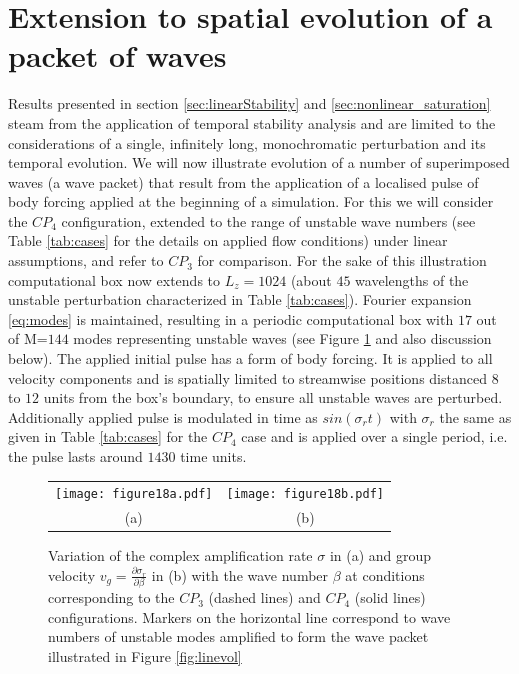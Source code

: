 \documentclass[lineno]{jfm}
\begin{document}
{
\section{Extension to spatial evolution of a packet of waves}
\label{sec:spat-temp}
Results presented in section \ref{sec:linearStability}
and \ref{sec:nonlinear_saturation} steam from the application of temporal stability analysis and are limited to the considerations of a single, infinitely long, monochromatic perturbation and its temporal evolution.
We will now illustrate evolution of a number of superimposed waves (a wave packet) that result from the application of a localised pulse of body forcing applied at the beginning of a simulation.
For this we will consider the $CP_4$ configuration, extended to the range of unstable wave numbers (see Table \ref{tab:cases} for the details on applied flow conditions) under linear assumptions, and refer to $CP_3$ for comparison.
For the sake of this illustration computational box now extends to $L_z=1024$ (about $45$ wavelengths of the unstable perturbation characterized in Table \ref{tab:cases}). Fourier expansion \eqref{eq:modes} is maintained, resulting in a periodic computational box with $17$ out of M=$144$ modes representing unstable waves (see Figure \ref{fig:cp3cp4} and also discussion below).
The applied initial pulse has a form of body forcing. It is applied to all velocity components and is spatially limited to streamwise positions distanced $8$ to $12$ units from the box's boundary, to ensure all unstable waves are perturbed.
Additionally applied pulse is modulated in time as $sin(\sigma_r t)$ with $\sigma_r$ the same as given in Table \ref{tab:cases} for the $CP_4$ case and is applied over a single period, i.e. the pulse lasts around $1430$ time units.

\begin{figure}
\centering
\setlength{\tabcolsep}{-2pt}
\begin{tabular}{cc}
    \texttt{[image: figure18a.pdf]} & 
    \texttt{[image: figure18b.pdf]} \\
    (a) & (b) \\
\end{tabular}
\caption{Variation of the complex amplification rate $\sigma$ in (a) and group velocity $v_g=\frac{\partial\sigma_r}{\partial\beta}$ in (b) with the wave number $\beta$ at conditions corresponding to the $CP_3$ (dashed lines) and $CP_4$ (solid lines) configurations.
Markers on the horizontal line correspond to wave numbers of unstable modes amplified to form the wave packet illustrated in Figure \ref{fig:linevol}} 
\label{fig:cp3cp4}
\end{figure}

}
\end{document}
